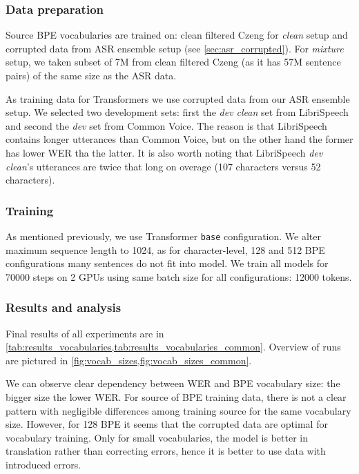 \subsubsection{Data preparation}
Source BPE vocabularies are trained on: clean filtered Czeng for \textit{clean} setup and corrupted data from ASR ensemble setup (see \cref{sec:asr_corrupted}). For \textit{mixture} setup, we taken subset of 7M from clean filtered Czeng (as it has 57M sentence pairs) of the same size as the ASR data.

As training data for Transformers we use corrupted data from our ASR ensemble setup. We selected two development sets: first the \textit{dev clean} set from LibriSpeech and second the \textit{dev} set from Common Voice. The reason is that LibriSpeech contains longer utterances than Common Voice, but on the other hand the former has lower WER tha the latter. It is also worth noting that LibriSpeech \textit{dev clean}'s utterances are twice that long on overage (107 characters versus 52 characters).

\subsubsection{Training}
As mentioned previously, we use Transformer \texttt{base} configuration. We alter maximum sequence length to 1024, as for character-level, 128 and 512 BPE configurations many sentences do not fit into model. We train all models for 70000 steps on 2 GPUs using same batch size for all configurations: 12000 tokens. 

\subsubsection{Results and analysis}
Final results of all experiments are in \cref{tab:results_vocabularies,tab:results_vocabularies_common}. Overview of runs are pictured in \cref{fig:vocab_sizes,fig:vocab_sizes_common}.

We can observe clear dependency between WER and BPE vocabulary size: the bigger size the lower WER. For source of BPE training data, there is not a clear pattern with negligible differences among training source for the same vocabulary size. However, for 128 BPE it seems that the corrupted data are optimal for vocabulary training. Only for small vocabularies, the model is better in translation rather than correcting errors, hence it is better to use data with introduced errors. 

